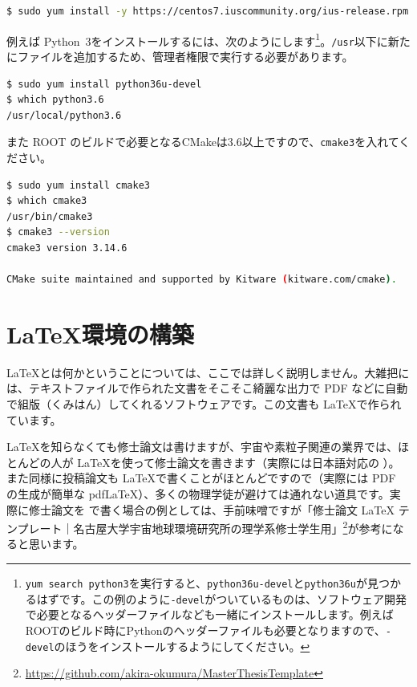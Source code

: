 \begin{lstlisting}[language=bash]
$ sudo yum install -y https://centos7.iuscommunity.org/ius-release.rpm
\end{lstlisting}

例えば Python~3をインストールするには、次のようにします\footnote{\texttt{yum search python3}を実行すると、\texttt{python36u-devel}と\texttt{python36u}が見つかるはずです。この例のように\texttt{-devel}がついているものは、ソフトウェア開発で必要となるヘッダーファイルなども一緒にインストールします。例えばROOTのビルド時にPythonのヘッダーファイルも必要となりますので、\texttt{-devel}のほうをインストールするようにしてください。}。\texttt{/usr}以下に新たにファイルを追加するため、管理者権限で実行する必要があります。

\begin{lstlisting}[language=bash]
$ sudo yum install python36u-devel
$ which python3.6
/usr/local/python3.6
\end{lstlisting}

また ROOT のビルドで必要となるCMakeは3.6以上ですので、\texttt{cmake3}を入れてください。

\begin{lstlisting}[language=bash]
$ sudo yum install cmake3
$ which cmake3
/usr/bin/cmake3
$ cmake3 --version
cmake3 version 3.14.6

CMake suite maintained and supported by Kitware (kitware.com/cmake).
\end{lstlisting}

\chapter{\LaTeX 環境の構築}
\label{chap:LaTeX}

\LaTeX とは何かということについては、ここでは詳しく説明しません。大雑把には、テキストファイルで作られた文書をそこそこ綺麗な出力で PDF などに自動で組版（くみはん）してくれるソフトウェアです。この文書も \LaTeX で作られています。

\LaTeX を知らなくても修士論文は書けますが、宇宙や素粒子関連の業界では、ほとんどの人が \LaTeX を使って修士論文を書きます（実際には日本語対応の \pLaTeX）。また同様に投稿論文も \LaTeX で書くことがほとんどですので（実際には PDF の生成が簡単な pdf\LaTeX）、多くの物理学徒が避けては通れない道具です。実際に修士論文を \pLaTeX で書く場合の例としては、手前味噌ですが「修士論文 LaTeX テンプレート｜名古屋大学宇宙地球環境研究所の理学系修士学生用」\footnote{\url{https://github.com/akira-okumura/MasterThesisTemplate}}が参考になると思います。

